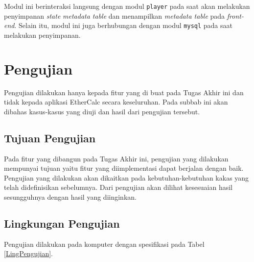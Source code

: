 Modul ini berinteraksi langsung dengan modul \texttt{player} pada saat akan melakukan penyimpanan \textit{state} \textit{metadata table} dan menampilkan \textit{metadata table} pada \textit{front-end}. Selain itu, modul ini juga berhubungan dengan modul \texttt{mysql} pada saat melakukan penyimpanan.

\section{Pengujian}
Pengujian dilakukan hanya kepada fitur yang di buat pada Tugas Akhir ini dan tidak kepada aplikasi EtherCalc secara keseluruhan. Pada subbab ini akan dibahas kasus-kasus yang diuji dan hasil dari pengujian tersebut.

\subsection{Tujuan Pengujian}
Pada fitur yang dibangun pada Tugas Akhir ini, pengujian yang dilakukan mempunyai tujuan yaitu fitur yang diimplementasi dapat berjalan dengan baik. Pengujian yang dilakukan akan dikaitkan pada kebutuhan-kebutuhan kakas yang telah didefinisikan sebelumnya. Dari pengujian akan dilihat kesesuaian hasil sesungguhnya dengan hasil yang diinginkan.


\subsection{Lingkungan Pengujian}
Pengujian dilakukan pada komputer dengan spesifikasi pada Tabel \ref{LingPengujian}.

